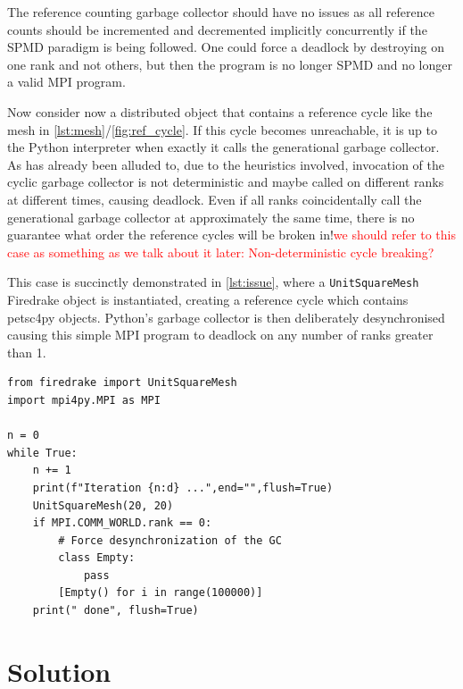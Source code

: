 \documentclass[10pt,journal,compsoc]{IEEEtran}
\newcommand{\jacknotes}[1]{\textcolor{red}{#1}}
\begin{document}
The reference counting garbage collector should have no issues as all reference counts should be incremented and decremented implicitly concurrently if the SPMD paradigm is being followed.
One could force a deadlock by destroying on one rank and not others, but then the program is no longer SPMD and no longer a valid MPI program.

Now consider now a distributed object that contains a reference cycle like the mesh in \cref{lst:mesh}/\cref{fig:ref_cycle}. If this cycle becomes unreachable, it is up to the Python interpreter when exactly it calls the generational garbage collector.
As has already been alluded to, due to the heuristics involved, invocation of the cyclic garbage collector is not deterministic and maybe called on different ranks at different times, causing deadlock.
Even if all ranks coincidentally call the generational garbage collector at approximately the same time, there is no guarantee what order the reference cycles will be broken in!\jacknotes{we should refer to this case as something as we talk about it later: Non-deterministic cycle breaking?}

This case is succinctly demonstrated in \cref{lst:issue}, where a \verb`UnitSquareMesh` Firedrake object is instantiated, creating a reference cycle which contains petsc4py objects. Python's garbage collector is then deliberately desynchronised causing this simple MPI program to deadlock on any number of ranks greater than 1.

\begin{lstlisting}[float={t}, caption={Example of code that forces a deadlock}, label={lst:issue}]
from firedrake import UnitSquareMesh
import mpi4py.MPI as MPI

n = 0
while True:
    n += 1
    print(f"Iteration {n:d} ...",end="",flush=True)
    UnitSquareMesh(20, 20)
    if MPI.COMM_WORLD.rank == 0:
        # Force desynchronization of the GC
        class Empty:
            pass
        [Empty() for i in range(100000)]
    print(" done", flush=True)
\end{lstlisting}

\section{Solution}
\label{sec:solution}
\end{document}
